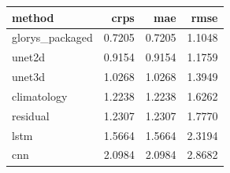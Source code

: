 \begin{tabular}{lrrr}
\toprule
method & crps & mae & rmse \\
\midrule
glorys_packaged & 0.7205 & 0.7205 & 1.1048 \\
unet2d & 0.9154 & 0.9154 & 1.1759 \\
unet3d & 1.0268 & 1.0268 & 1.3949 \\
climatology & 1.2238 & 1.2238 & 1.6262 \\
residual & 1.2307 & 1.2307 & 1.7770 \\
lstm & 1.5664 & 1.5664 & 2.3194 \\
cnn & 2.0984 & 2.0984 & 2.8682 \\
\bottomrule
\end{tabular}
